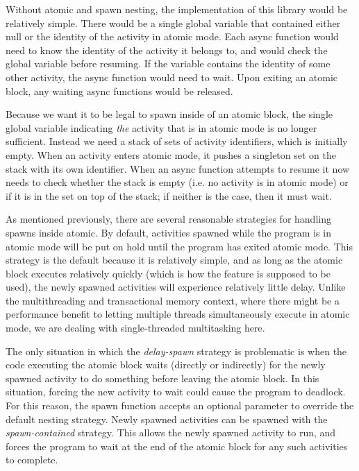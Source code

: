 \documentclass[acmsmall,anonymous,review]{acmart}\settopmatter{printfolios=true,printccs=false,printacmref=false}
\begin{document}
Without atomic and spawn nesting, the implementation of this library would be relatively simple.
There would be a single global variable that contained either null or the identity of the activity in atomic mode.
Each async function would need to know the identity of the activity it belongs to, and would check the global variable before resuming.
If the variable contains the identity of some other activity, the async function would need to wait.
Upon exiting an atomic block, any waiting async functions would be released.

Because we want it to be legal to spawn inside of an atomic block, the single global variable indicating \emph{the} activity that is in atomic mode is no longer sufficient.
Instead we need a stack of sets of activity identifiers, which is initially empty.
When an activity enters atomic mode, it pushes a singleton set on the stack with its own identifier.
When an async function attempts to resume it now needs to check whether the stack is empty (i.e. no activity is in atomic mode) or if it is in the set on top of the stack; if neither is the case, then it must wait.

As mentioned previously, there are several reasonable strategies for handling spawns inside atomic.
By default, activities spawned while the program is in atomic mode will be put on hold until the program has exited atomic mode.
This strategy is the default because it is relatively simple, and as long as the atomic block executes relatively quickly (which is how the feature is supposed to be used), the newly spawned activities will experience relatively little delay.
Unlike the multithreading and transactional memory context, where there might be a performance benefit to letting multiple threads simultaneously execute in atomic mode, we are dealing with single-threaded multitasking here.

The only situation in which the \emph{delay-spawn} strategy is problematic is when the code executing the atomic block waits (directly or indirectly) for the newly spawned activity to do something before leaving the atomic block.
In this situation, forcing the new activity to wait could cause the program to deadlock.
For this reason, the spawn function accepts an optional parameter to override the default nesting strategy.
Newly spawned activities can be spawned with the \emph{spawn-contained} strategy.
This allows the newly spawned activity to run, and forces the program to wait at the end of the atomic block for any such activities to complete.
\end{document}
